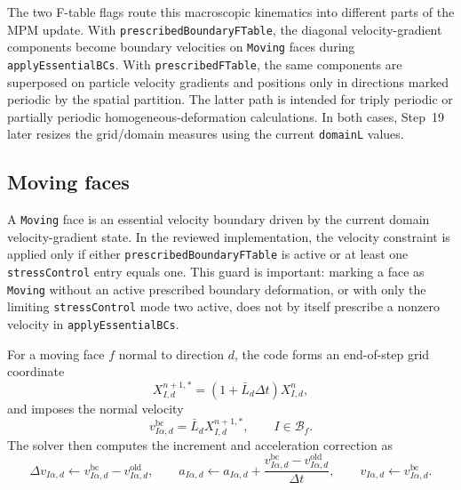 The two F-table flags route this macroscopic kinematics into different parts of the MPM update.  With \texttt{prescribedBoundaryFTable}, the diagonal velocity-gradient components become boundary velocities on \texttt{Moving} faces during \texttt{applyEssentialBCs}.  With \texttt{prescribedFTable}, the same components are superposed on particle velocity gradients and positions only in directions marked periodic by the spatial partition.  The latter path is intended for triply periodic or partially periodic homogeneous-deformation calculations.  In both cases, Step~19 later resizes the grid/domain measures using the current \texttt{domainL} values.

\subsection{Moving faces}
\label{subsec:bc-moving}

A \texttt{Moving} face is an essential velocity boundary driven by the current domain velocity-gradient state.  In the reviewed implementation, the velocity constraint is applied only if either \texttt{prescribedBoundaryFTable} is active or at least one \texttt{stressControl} entry equals one.  This guard is important: marking a face as \texttt{Moving} without an active prescribed boundary deformation, or with only the limiting \texttt{stressControl} mode two active, does not by itself prescribe a nonzero velocity in \texttt{applyEssentialBCs}.

For a moving face $f$ normal to direction $d$, the code forms an end-of-step grid coordinate
\begin{equation}
  X_{I,d}^{n+1,*}=\left(1+\bar L_d\Delta t\right)X_{I,d}^{n},
\end{equation}
and imposes the normal velocity
\begin{equation}
  v_{I\alpha,d}^{\mathrm{bc}} = \bar L_d X_{I,d}^{n+1,*},
  \qquad I\in\mathcal{B}_f.
  \label{eq:bc-moving-normal-velocity}
\end{equation}
The solver then computes the increment and acceleration correction as
\begin{equation}
  \Delta v_{I\alpha,d} \leftarrow v_{I\alpha,d}^{\mathrm{bc}}-v_{I\alpha,d}^{\mathrm{old}},
  \qquad
  a_{I\alpha,d} \leftarrow a_{I\alpha,d}+\frac{v_{I\alpha,d}^{\mathrm{bc}}-v_{I\alpha,d}^{\mathrm{old}}}{\Delta t},
  \qquad
  v_{I\alpha,d}\leftarrow v_{I\alpha,d}^{\mathrm{bc}}.
  \label{eq:bc-moving-normal-correction}
\end{equation}

